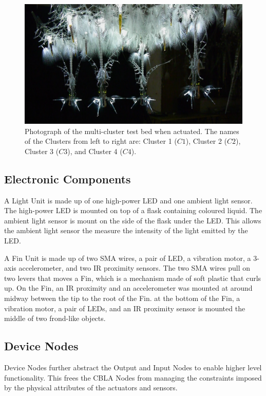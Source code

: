 \begin{figure} [!htbp]
	\centering
	\includegraphics[width=1.0\textwidth]{"fig/validations/cbla-test-bed photo 2"}
	\caption[Photograph of the multi-cluster test bed]{Photograph of the multi-cluster test bed when actuated. The names of the Clusters from left to right are: Cluster 1 ($C1$), Cluster 2 ($C2$), Cluster 3 ($C3$), and Cluster 4 ($C4$).}
	\label{fig:cbla-test-bed photo 2}
\end{figure}


\subsection{Electronic Components}

A Light Unit is made up of one high-power LED and one ambient light sensor. The high-power LED is mounted on top of a flask containing coloured liquid. The ambient light sensor is mount on the side of the flask under the LED. This allows the ambient light sensor the measure the intensity of the light emitted by the LED. 

A Fin Unit is made up of two SMA wires, a pair of LED, a vibration motor, a 3-axis accelerometer, and two IR proximity sensors. The two SMA wires pull on two levers that moves a Fin, which is a mechanism made of soft plastic that curls up. On the Fin, an IR proximity and an accelerometer was mounted at around midway between the tip to the root of the Fin. at the bottom of the Fin, a vibration motor, a pair of LEDs, and an IR proximity sensor is mounted the middle of two frond-like objects. 

\subsection{Device Nodes}

Device Nodes further abstract the Output and Input Nodes to enable higher level functionality. This frees the CBLA Nodes from managing the constraints imposed by the physical attributes of the actuators and sensors. 

